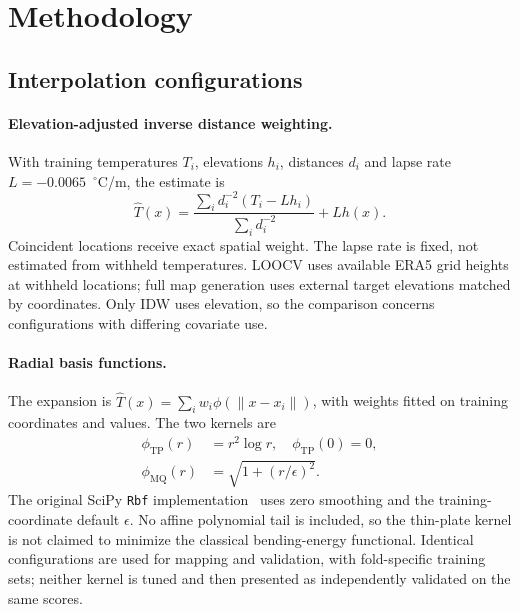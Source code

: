 \documentclass[11pt,a4paper]{article}
\newcommand{\degC}{\ensuremath{{}^{\circ}\mathrm{C}}}
\begin{document}
\section{Methodology}
\subsection{Interpolation configurations}
\paragraph{Elevation-adjusted inverse distance weighting.} With training temperatures $T_i$, elevations $h_i$, distances $d_i$ and lapse rate $L=-0.0065$~\degC/m, the estimate is
\begin{equation}
\widehat T(x)=\frac{\sum_i d_i^{-2}(T_i-Lh_i)}{\sum_i d_i^{-2}}+Lh(x).
\end{equation}
Coincident locations receive exact spatial weight. The lapse rate is fixed, not estimated from withheld temperatures. LOOCV uses available ERA5 grid heights at withheld locations; full map generation uses external target elevations matched by coordinates. Only IDW uses elevation, so the comparison concerns configurations with differing covariate use.

\paragraph{Radial basis functions.} The expansion is $\widehat T(x)=\sum_i w_i\phi(\lVert x-x_i\rVert)$, with weights fitted on training coordinates and values. The two kernels are
\begin{align}
\phi_{\mathrm{TP}}(r)&=r^2\log r,\quad \phi_{\mathrm{TP}}(0)=0,\\
\phi_{\mathrm{MQ}}(r)&=\sqrt{1+(r/\epsilon)^2}.
\end{align}
The original SciPy \texttt{Rbf} implementation~\cite{rbf} uses zero smoothing and the training-coordinate default $\epsilon$. No affine polynomial tail is included, so the thin-plate kernel is not claimed to minimize the classical bending-energy functional. Identical configurations are used for mapping and validation, with fold-specific training sets; neither kernel is tuned and then presented as independently validated on the same scores.
\end{document}

